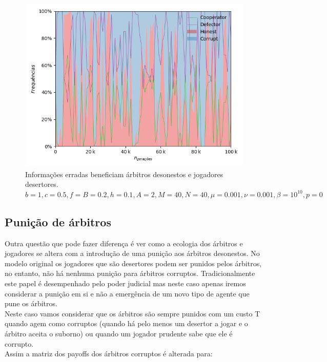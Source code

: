 \documentclass[conference, twocolumn]{IEEEtran}
\theoremstyle{plain}
\theoremstyle{definition}
\theoremstyle{remark}
\begin{document}
    \begin{figure}[h]
        \centering
        \includegraphics[width=1\linewidth]{images/incerteza_total.png}
        \caption{\small Informações erradas beneficiam árbitros desonestos e jogadores desertores. $b=1, c=0.5, f=B=0.2, h=0.1, A=2, M=40, N=40, \mu=0.001, \nu=0.001, \beta=10^{10}, p=0$}
        \label{fig:incerteza_total}
    \end{figure}

    \subsection{Punição de árbitros}
    Outra questão que pode fazer diferença é ver como a ecologia dos árbitros e jogadores se altera com a introdução de uma punição aos árbitros desonestos. No modelo original os jogadores que são desertores podem ser punidos pelos árbitros, no entanto, não há nenhuma punição para árbitros corruptos. Tradicionalmente este papel é desempenhado pelo poder judicial mas neste caso apenas iremos considerar a punição em si e não a emergência de um novo tipo de agente que pune os árbitros.\\
    Neste caso vamos considerar que os árbitros são sempre punidos com um custo T quando agem como corruptos (quando há pelo menos um desertor a jogar e o árbitro aceita o suborno) ou quando um jogador prudente sabe que ele é corrupto. \\ Assim a matriz dos payoffs dos árbitros corruptos é alterada para:
\end{document}
